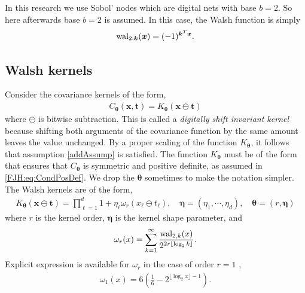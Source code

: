 \documentclass{svjour3}                     %
\newcommand{\bm}[1]{\boldsymbol{#1}}
\newcommand{\veta}{{\bm{\eta}}}
\newcommand{\vtheta}{{\bm{\theta}}}
\newcommand{\vk}{\bm{k}}
\newcommand{\vt}{\bm{t}}
\newcommand{\vx}{\bm{x}}
\newcommand{\JRNote}[1]{{\textcolor{green}{JR: #1}}}
\begin{document}
In this research we use Sobol' nodes which are digital nets with base $b=2$. So here afterwards base $b=2$ is assumed. %
In this case, the Walsh function is simply $$\textup{wal}_{2,\vk} (\vx) = (-1)^{\vec{\vk}^T \vec{\vx}}.$$

\subsection{Walsh kernels}
Consider the covariance kernels of the form,
\begin{align}
\label{eqn:digital_shift_in_kernel}
C_{\vtheta}(\vx, \vt) = K_{\vtheta} (\vx \ominus \vt) 
\end{align}
where $\ominus$ is bitwise subtraction.
This is called a \emph{digitally shift invariant kernel} because shifting both arguments of the covariance function by the same amount leaves the value unchanged. By a proper scaling of the function $K_{\vtheta}$, it follows that assumption \eqref{addAssump} is satisfied. The function $K_{\vtheta}$ must be of the form that ensures that $C_{\vtheta}$ is symmetric and positive definite, as assumed in \eqref{FJH:eq:CondPosDef}. We drop the ${\vtheta}$ sometimes to make the notation simpler.
The Walsh kernels are of the form,
\begin{align}
\label{eqn:walsh_kernel}
K_{\vtheta} (\vx \ominus \vt) =  
\prod_{\ell=1}^d  1 + \eta_\ell \omega_{r} (x_\ell \ominus t_\ell), \quad \veta = (\eta_1, \cdots, \eta_d), \quad \vtheta = (r, \veta)
\end{align}
where $r$ is the kernel order, $\veta$ is the kernel shape parameter, and
\begin{align*}
\omega_r(x) = \sum_{k=1}^\infty 
\frac{\textup{wal}_{2,k}(x) }{2^{2r \lfloor \log_2 k \rfloor}}.
\end{align*}
Explicit expression is available for $\omega_{r}$ in the case of order $r=1$ \cite{Nuyens2013}, %
\begin{align}
\label{eqn:omega1}
\omega_1(x) 
= 6\left( \frac 16 - 2^{\lfloor \log_2 x \rfloor -1 }\right).
\end{align}
\end{document}

